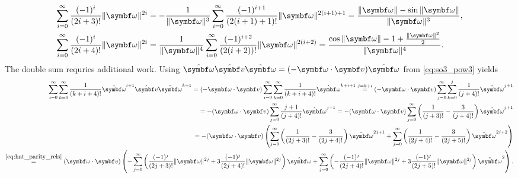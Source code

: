 \begin{subequations}
  \begin{align}
    \label{eq:sine_sum}
    \sum_{i=0}^\infty \frac{(-1)^i}{(2i+3)!} \| \bomega \|^{2i}   & = - \frac{1}{\| \bomega \|^3} \sum_{i=0}^\infty \frac{(-1)^{i+1}}{(2(i+1)+1)!} \| \bomega \|^{2(i+1) + 1} = \frac{\| \bomega \| - \sin \| \bomega \|}{\| \bomega \|^3} ,         \\
    \label{eq:cosine_sum}
    \sum_{i=0}^\infty \frac{(-1)^{i}}{(2i+4)!} \| \bomega \|^{2i} & = \frac{1}{\| \bomega \|^4} \sum_{i=0}^\infty \frac{(-1)^{i+2}}{(2(i+2))!} \| \bomega \|^{2(i + 2)} =  \frac{\cos \| \bomega \| - 1 + \frac{\|\bomega\|^2}{2}}{\| \bomega \|^4}.
  \end{align}
\end{subequations}
The double sum requries additional work. Using $\hat \bomega \hat \bv \hat \bomega = (-\bomega \cdot \bv) \hat \bomega$ from \eqref{eq:so3_pow3} yields
\begin{equation*}
  \begin{aligned}
    \sum_{i = 0}^\infty \sum_{k = 0}^\infty \frac{1}{(k+i+4)!} \hat \bomega^{i+1} \hat \bv \hat \bomega^{k+1} = (-\bomega \cdot \bv) \sum_{i = 0}^\infty \sum_{k = 0}^\infty \frac{1}{(k+i+4)!} \hat \bomega^{k+i+1}  \overset{j = k+i}=  (-\bomega \cdot \bv) \sum_{j = 0}^\infty \sum_{k = 0}^{j} \frac{1}{(j+4)!} \hat \bomega^{j+1} \\
    = -(\bomega \cdot \bv) \sum_{j = 0}^\infty \frac{j+1}{(j+4)!} \hat \bomega^{j+1} = -(\bomega \cdot \bv) \sum_{j=0}^\infty \left(\frac{1}{(j+3)!} - \frac{3}{(j+4)!} \right) \hat \bomega^{j+1}                                                                                                                                      \\
    = -(\bomega \cdot \bv) \left( \sum_{j=0}^\infty \left(\frac{1}{(2j+3)!} - \frac{3}{(2j+4)!} \right) \hat \bomega^{2j+1} + \sum_{j=0}^\infty \left(\frac{1}{(2j+4)!} - \frac{3}{(2j+5)!} \right) \hat \bomega^{2j+2} \right)                                                                                                         \\
    \overset{\eqref{eq:hat_parity_rels}}= (\bomega \cdot \bv) \left( -\sum_{j=0}^\infty \left(\frac{(-1)^j  }{(2j+3)!}\| \bomega \|^{2j} + 3\frac{(-1)^j }{(2j+4)!} \| \bomega \|^{2j}\right)  \hat \bomega + \sum_{j=0}^\infty \left(-\frac{(-1)^j  }{(2j+4)!} \| \bomega \|^{2j} + 3\frac{(-1)^j  }{(2j+5)!}\| \bomega \|^{2j} \right) \hat \bomega^2 \right).
  \end{aligned}
\end{equation*}
